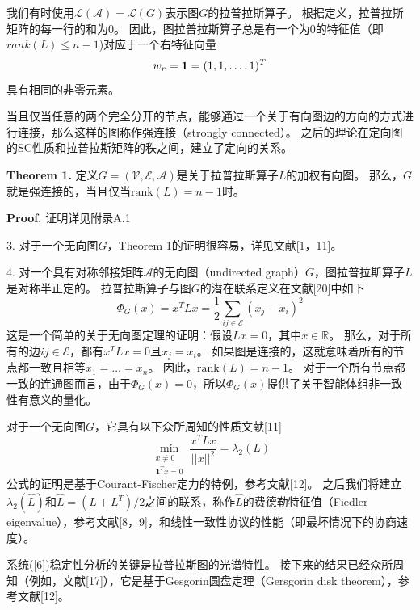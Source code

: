 \documentclass{article}
\begin{document}
我们有时使用$\mathcal{L}(\mathcal{A}) = \mathcal{L}(G)$表示图$G$的拉普拉斯算子。
根据定义，拉普拉斯矩阵的每一行的和为0。
因此，图拉普拉斯算子总是有一个为0的特征值（即$rank(L)\le n-1$)对应于一个右特征向量
\begin{equation}
    w_r = \mathbf{1} = (1,1,\dots,1)^T \notag
\end{equation}
具有相同的非零元素。

当且仅当任意的两个完全分开的节点，能够通过一个关于有向图边的方向的方式进行连接，那么这样的图称作强连接（strongly connected）。
之后的理论在定向图的SC性质和拉普拉斯矩阵的秩之间，建立了定向的关系。

\noindent \textbf{Theorem 1.} 定义$G=(\mathcal{V},\mathcal{E},\mathcal{A})$是关于拉普拉斯算子$L$的加权有向图。
那么，$G$就是强连接的，当且仅当$\text{rank}(L)=n-1$时。

\noindent \textbf{Proof.} 证明详见附录A.1

 3. 对于一个无向图$G$，Theorem 1的证明很容易，详见文献[1，11]。

 4. 对一个具有对称邻接矩阵$\mathcal{A}$的无向图（undirected graph）$G$，图拉普拉斯算子$L$是对称半正定的。
拉普拉斯算子与图$G$的潜在联系定义在文献[20]中如下
\begin{equation}
    \Phi_G(x) = x^T Lx = \frac{1}{2} \sum_{ij\in \mathcal{E}}(x_j - x_i)^2
\end{equation}
这是一个简单的关于无向图定理的证明：假设$Lx=0$，其中$x\in \mathbb{R}$。
那么，对于所有的边$ij\in \mathcal{E}$，都有$x^TLx=0$且$x_j=x_i$。
如果图是连接的，这就意味着所有的节点都一致且相等$x_1=\dots=x_n$。
因此，$\text{rank}(L)=n-1$。
对于一个所有节点都一致的连通图而言，由于$\Phi_G(x)=0$，所以$\Phi_G(x)$提供了关于智能体组非一致性有意义的量化。

对于一个无向图$G$，它具有以下众所周知的性质文献[11]
\begin{equation}
    \min_{\substack{x\ne 0\\   \mathbf{1}^Tx=0}} \frac{x^T Lx}{||x||^2}=\lambda_2(L)
\end{equation}
公式的证明是基于Courant-Fischer定力的特例，参考文献[12]。
之后我们将建立$\lambda_2(\hat{L})$和$\hat{L}=(L+L^T)/2$之间的联系，称作$\hat{L}$的费德勒特征值（Fiedler eigenvalue），参考文献[8，9]，和线性一致性协议的性能（即最坏情况下的协商速度）。

系统(\ref{6})稳定性分析的关键是拉普拉斯图的光谱特性。
接下来的结果已经众所周知（例如，文献[17]），它是基于Gesgorin圆盘定理（Gersgorin disk theorem），参考文献[12]。
\end{document}
